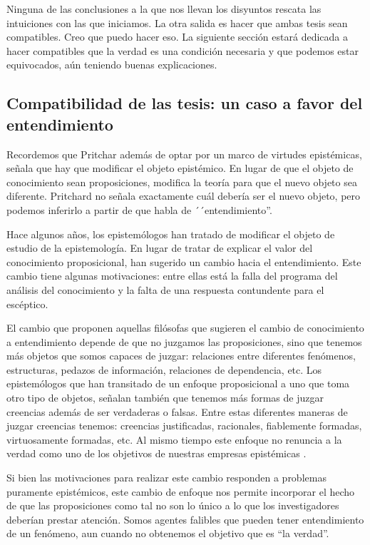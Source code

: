 \documentclass{article}
\begin{document}
Ninguna de las conclusiones a la que nos llevan los disyuntos rescata las intuiciones con las que iniciamos. La otra salida es hacer que ambas tesis sean compatibles. Creo que puedo hacer eso. La siguiente sección estará dedicada a hacer compatibles que la verdad es una condición necesaria y que podemos estar equivocados, aún teniendo buenas explicaciones.

\subsection{Compatibilidad de las tesis: un caso a favor del entendimiento}

\noindent Recordemos que Pritchar además de optar por un marco de virtudes epistémicas, señala que hay que modificar el objeto epistémico. En lugar de que el objeto de conocimiento sean proposiciones, modifica la teoría para que el nuevo objeto sea diferente. Pritchard no señala exactamente cuál debería ser el nuevo objeto, pero podemos inferirlo a partir de que habla de ´´entendimiento''. 

Hace algunos años, los epistemólogos han tratado de modificar el objeto de estudio de la epistemología. En lugar de tratar de explicar el valor del conocimiento proposicional, han sugerido un cambio hacia el entendimiento. Este cambio tiene algunas motivaciones: entre ellas está la falla del programa del análisis del conocimiento y la falta de una respuesta contundente para el escéptico. 

El cambio que proponen aquellas filósofas que sugieren el cambio de conocimiento a entendimiento depende de que no juzgamos las proposiciones, sino que tenemos más objetos que somos capaces de juzgar: relaciones entre diferentes fenómenos, estructuras, pedazos de información, relaciones de dependencia, etc. Los epistemólogos que han transitado de un enfoque proposicional a uno que toma otro tipo de objetos, señalan también que tenemos más formas de juzgar creencias además de ser verdaderas o falsas. Entre estas diferentes maneras de juzgar creencias tenemos: creencias justificadas, racionales, fiablemente formadas, virtuosamente formadas, etc. Al mismo tiempo este enfoque no renuncia a la verdad como uno de los objetivos de nuestras empresas epistémicas \cite{Grimm2012-GRITVO-4}.

Si bien las motivaciones para realizar este cambio responden a problemas puramente epistémicos, este cambio de enfoque nos permite incorporar el hecho de que las proposiciones como tal no son lo único a lo que los investigadores deberían prestar atención. Somos agentes falibles que pueden tener entendimiento de un fenómeno, aun cuando no obtenemos el objetivo que es ``la verdad''.
\end{document}
